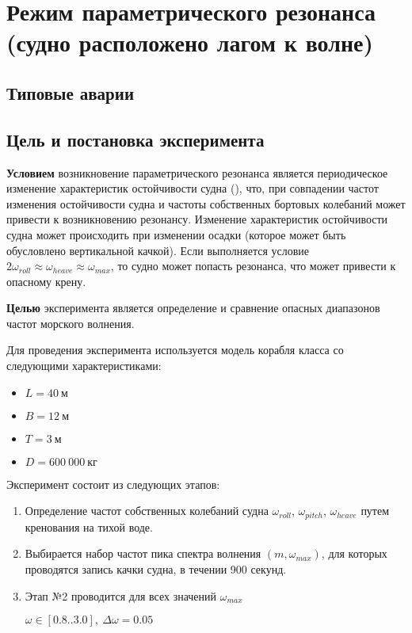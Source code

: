 \section{Режим параметрического резонанса (судно расположено лагом к волне)}

\subsection{Типовые аварии}


\subsection{Цель и постановка эксперимента}

\textbf{Условием} возникновение параметрического резонанса является периодическое изменение характеристик остойчивости судна (), что, при совпадении частот изменения остойчивости судна и частоты собственных бортовых колебаний может привести к возникновению резонансу.
Изменение характеристик остойчивости судна может происходить при изменении осадки (которое может быть обусловлено вертикальной качкой). Если выполняется условие
$2 \omega_{roll} \approx \omega_{heave} \approx \omega_{max}$, то судно может попасть резонанса, что может привести к опасному крену.

\textbf{Целью} эксперимента является определение и сравнение опасных диапазонов частот морского волнения.

Для проведения эксперимента используется модель корабля класса  со следующими характеристиками:
\begin{itemize}
	\item	$L = 40\ \text{м}$
	\item	$B = 12\ \text{м}$
	\item	$T = 3\ \text{м}$
	\item	$D = 600\ 000\ \text{кг}$
\end{itemize}

Эксперимент состоит из следующих этапов:
\begin{enumerate}
	\item	Определение частот собственных колебаний судна 
			$\omega_{roll}$, $\omega_{pitch}$, $\omega_{heave}$ путем кренования на тихой воде.
	\item	Выбирается набор частот пика спектра волнения $(m, \omega_{max})$, для которых
			проводятся запись качки судна, в течении 900 секунд.
	\item	Этап №2	проводится для всех значений $\omega_{max}$
			
			$\omega \in [0.8..3.0],\ \Delta\omega=0.05$ 

\end{enumerate}

